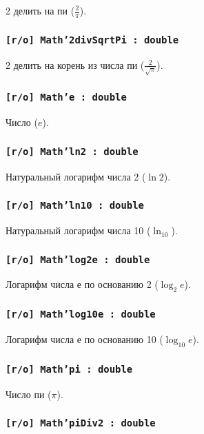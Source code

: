 2 делить на пи ($\frac{2}{\pi}$).

\subsubsection{\texttt{[r/o] Math'2divSqrtPi : double}}

2 делить на корень из числа пи ($\frac{2}{\sqrt{\pi}}$).

\subsubsection{\texttt{[r/o] Math'e : double}}

Число ($e$).

\subsubsection{\texttt{[r/o] Math'ln2 : double}}

Натуральный логарифм числа 2 ($\ln{2}$).

\subsubsection{\texttt{[r/o] Math'ln10 : double}}

Натуральный логарифм числа 10 ($\ln_{10}$).

\subsubsection{\texttt{[r/o] Math'log2e : double}}

Логарифм числа е по основанию 2 ($\log_{2}{e}$).

\subsubsection{\texttt{[r/o] Math'log10e : double}}

Логарифм числа е по основанию 10 ($\log_{10}{e}$).

\subsubsection{\texttt{[r/o] Math'pi : double}}

Число пи ($\pi$).

\subsubsection{\texttt{[r/o] Math'piDiv2 : double}}

